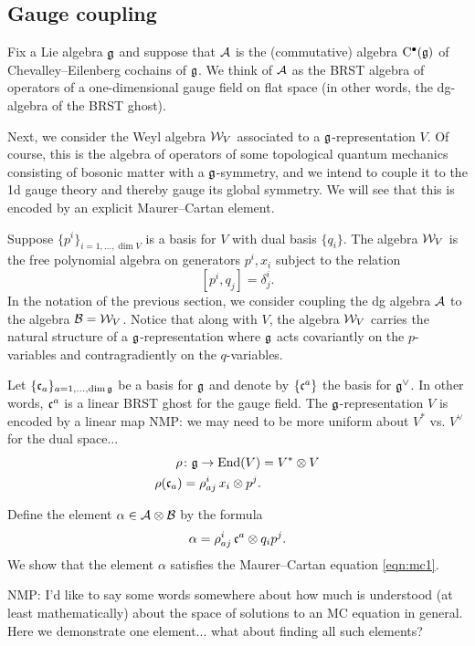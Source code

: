\documentclass[11pt]{amsart}
\def\natalie#1{{\textcolor{green!65!black}{NMP: {#1}}}}
\begin{document}
\subsection{Gauge coupling} \label{sec:gaugealg}

Fix a Lie algebra $\mathfrak g$ and
suppose that $\mathcal A$ is the (commutative) algebra ${\rm C}^\bullet(\mathfrak g)$ of Chevalley--Eilenberg cochains of $\mathfrak g$. 
We think of $\mathcal A$ as the BRST algebra of operators of a one-dimensional gauge field on flat space (in other words, the dg-algebra of the BRST ghost). 

Next, we consider the Weyl algebra $\mathcal W_V$ associated to a $\mathfrak g$-representation $V$. Of course, this is the algebra of operators of some topological quantum mechanics consisting of bosonic matter with a $\mathfrak g$-symmetry, and we intend to couple it to the 1d gauge theory and thereby gauge its global symmetry.
We will see that this is encoded by an explicit Maurer--Cartan element. 

Suppose $\{p^i\}_{i=1,\ldots,\dim V}$ is a basis for $V$ with dual basis $\{q_i\}$. 
The algebra $\mathcal W_V$ is the free polynomial algebra on generators $p^i, x_i$ subject to the relation 
\[
[p^i, q_j] = \delta_j^i .
\]
In the notation of the previous section, we consider coupling the dg algebra $\mathcal A$ to the algebra $\mathcal B = \mathcal W_V$. 
Notice that along with $V$, the algebra $\mathcal W_V$ carries the natural structure of a $\mathfrak g$-representation where $\mathfrak g$ acts covariantly on the $p$-variables and contragradiently on the $q$-variables. 

Let $\{\mathfrak c_a\}_{a=1,\dots,\dim \mathfrak g}$ be a basis for $\mathfrak g$ and denote by $\{\mathfrak c^a\}$ the basis for $\mathfrak g^\vee$. 
In other words, $\mathfrak c^a$ is a linear BRST ghost for the gauge field. 
The $\mathfrak g$-representation $V$ is encoded by a linear map \natalie{we may need to be more uniform about $V^*$ vs. $V^{\vee}$ for the dual space...}
\begin{align*}
\rho & \colon \mathfrak g \to {\rm End}(V) = V^* \otimes V \\
\rho(\mathfrak c_a) & = \rho_{aj}^i \, x_i \otimes p^j .
\end{align*}

Define the element $\alpha \in \mathcal A \otimes \mathcal B$ by the formula
\[
\alpha = \rho_{aj}^i \, \mathfrak c^a \otimes q_i p^j .
\]
We show that the element $\alpha$ satisfies the Maurer--Cartan equation \eqref{eqn:mc1}. 

\natalie{I'd like to say some words somewhere about how much is understood (at least mathematically) about the space of solutions to an MC equation in general. Here we demonstrate one element... what about finding all such elements?}
\end{document}
